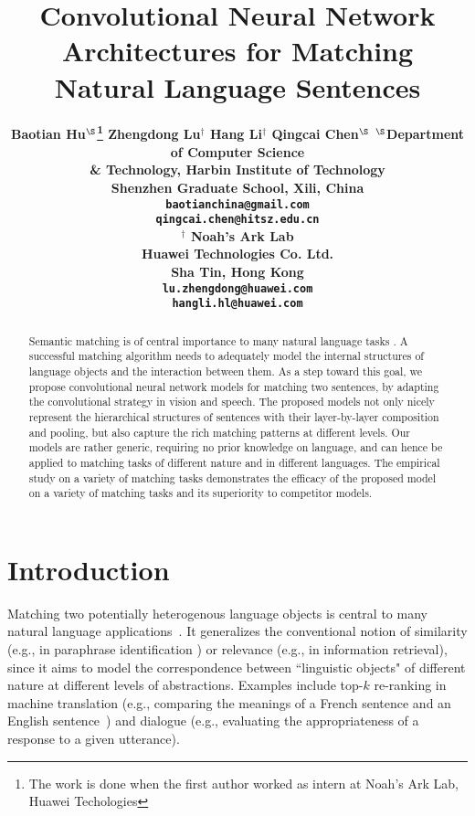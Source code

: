 \documentclass{article} \usepackage{nips14submit_e,times}
\title{Convolutional Neural Network  Architectures for Matching Natural Language Sentences}
\author{
\bf{Baotian Hu}$^\mathbf{\S}$\thanks{The work is done when the first author worked as intern at
Noah's Ark Lab, Huawei Techologies}
\And
\bf{Zhengdong Lu}$^\mathbf{\dag}$
\And
\bf{Hang Li}$^\mathbf{\dag}$
\And
\bf{Qingcai Chen}$^\mathbf{\S}$
\AND
$^\mathbf{\S}$Department of Computer Science\\
\& Technology, Harbin Institute of Technology\\
Shenzhen Graduate School, Xili, China \\
\texttt{baotianchina@gmail.com}\\
\texttt{qingcai.chen@hitsz.edu.cn}\\
\And
$^\mathbf{\dag}$ Noah's Ark Lab \\
Huawei Technologies Co. Ltd.\\
Sha Tin, Hong Kong \\
\texttt{lu.zhengdong@huawei.com}\\
\texttt{hangli.hl@huawei.com}\\
}
\newcommand{\0}{\ensuremath{\mathbf{0}}}
\newcommand{\1}{\ensuremath{\mathbf{1}}}
\begin{document}
\maketitle

\begin{abstract}
Semantic matching is of central importance to many natural language tasks \cite{bordes2014semantic,RetrievalQA}. A successful matching algorithm needs to adequately model the internal structures of language objects and the interaction between them. As a step toward this goal, we propose convolutional neural network models for matching two sentences, by adapting the convolutional strategy in vision and speech.  The proposed models not only nicely represent the hierarchical structures of sentences with their layer-by-layer composition and pooling, but also capture the rich matching patterns at different levels. Our models are rather generic, requiring no prior knowledge on language, and can hence be applied to matching tasks of different nature and in different languages. The empirical study on a variety of matching tasks demonstrates the efficacy of the proposed model on a variety of matching tasks and its superiority to competitor models.
\end{abstract}

\section{Introduction} \vspace{-10pt}
Matching two potentially heterogenous language objects is central to many natural language applications~\cite{RetrievalQA,bordes2014semantic}. It generalizes the conventional notion of similarity (e.g., in paraphrase identification \cite{socher2011}) or relevance (e.g., in information retrieval\cite{wu2013learning}), since it aims to model the correspondence between ``linguistic objects" of different nature at different levels of abstractions. Examples include top-$k$ re-ranking in  machine translation (e.g., comparing the meanings of a French sentence and an English sentence~\cite{ibmmodel}) and dialogue (e.g., evaluating the appropriateness of a response to a given utterance\cite{emnlpmatch}).
\end{document}
